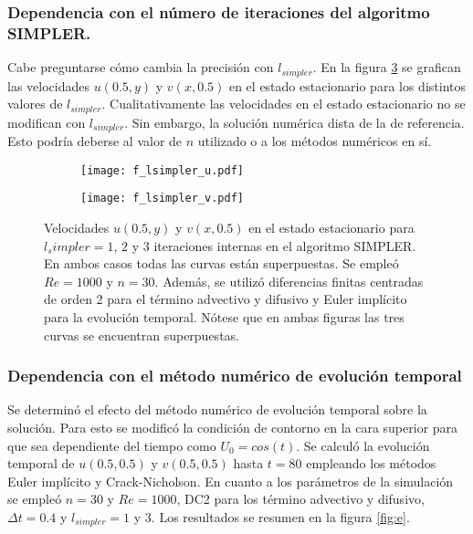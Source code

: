 \documentclass[aps,prb,twocolumn,superscriptaddress,floatfix,longbibliography,10pt]{revtex4-2}
\newcounter{para}
\begin{document}
\subsubsection{Dependencia con el número de iteraciones del algoritmo SIMPLER.}

Cabe preguntarse cómo cambia la precisión con $l_{simpler}$. En la figura \ref{fig:lsimpler} se grafican las velocidades $u(0.5,y)$ y $v(x,0.5)$ en el estado estacionario para los distintos valores de $l_{simpler}$. Cualitativamente las velocidades en el estado estacionario no se modifican con $l_{simpler}$. Sin embargo, la solución numérica dista de la de referencia. Esto podría deberse al valor de $n$ utilizado o a los métodos numéricos en sí.

\begin{figure}
  \centering
  \begin{subfigure}[b]{0.45\textwidth}
      \centering
      \texttt{[image: f\_lsimpler\_u.pdf]}
      \caption{}
      \label{fig:lsimpler_u}
  \end{subfigure}
  \hfill
  \begin{subfigure}[b]{0.45\textwidth}
      \centering
      \texttt{[image: f\_lsimpler\_v.pdf]}
      \caption{}
      \label{fig:lsimpler_v}
  \end{subfigure}
     \caption{Velocidades $u(0.5,y)$ y $v(x,0.5)$ en el estado estacionario para $l_simpler = 1$, $2$ y $3$ iteraciones internas en el algoritmo SIMPLER. En ambos casos todas las curvas están superpuestas. Se empleó $Re = 1000$ y $n = 30$. Además, se utilizó diferencias finitas centradas de orden 2 para el término advectivo y difusivo y Euler implícito para la evolución temporal. Nótese que en ambas figuras las tres curvas se encuentran superpuestas.}
     \label{fig:lsimpler}
\end{figure}

\subsubsection{Dependencia con el método numérico de evolución temporal}
Se determinó el efecto del método numérico de evolución temporal sobre la solución. Para esto se modificó la condición de contorno en la cara superior para que sea dependiente del tiempo como $U_0 = cos(t)$. Se calculó la evolución temporal de $u(0.5,0.5)$ y $v(0.5,0.5)$ hasta $t = 80$ empleando los métodos Euler implícito y Crack-Nicholson. En cuanto a los parámetros de la simulación se empleó $n = 30$ y $Re = 1000$, DC2 para los término advectivo y difusivo, $\Delta t = 0.4$ y $l_{simpler} = 1$ y $3$. Los resultados se resumen en la figura \ref{fig:e}.
  
\end{document}
